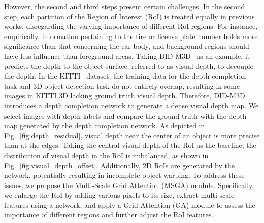 \documentclass[journal]{IEEEtran}
\begin{document}
	However, the second and third steps present certain challenges. In the second step, each partition of the Region of Interest (RoI) is treated equally in previous works, disregarding the varying importance of different RoI regions. For instance, empirically, information pertaining to the tire or license plate number holds more significance than that concerning the car body, and background regions should have less influence than foreground areas. Taking DID-M3D~\cite{didm3d} as an example, it predicts the depth to the object surface, referred to as visual depth, to decouple the depth. In the KITTI~\cite{kitti} dataset, the training data for the depth completion task and 3D object detection task do not entirely overlap, resulting in some images in KITTI 3D lacking ground truth visual depth. Therefore, DID-M3D introduces a depth completion network to generate a dense visual depth map. We select images with depth labels and compare the ground truth with the depth map generated by the depth completion network. As depicted in Fig.~\ref{fig:depth_residual}, visual depth near the center of an object is more precise than at the edges. Taking the central visual depth of the RoI as the baseline, the distribution of visual depth in the RoI is imbalanced, as shown in Fig.~\ref{fig:visual_depth_offset}. Additionally, 2D RoIs are generated by the network, potentially resulting in incomplete object warping. To address these issues, we propose the Multi-Scale Grid Attention (MSGA) module. Specifically, we enlarge the RoI by adding various pixels to its size, extract multi-scale features using a network, and apply a Grid Attention (GA) module to assess the importance of different regions and further adjust the RoI features.
\end{document}
